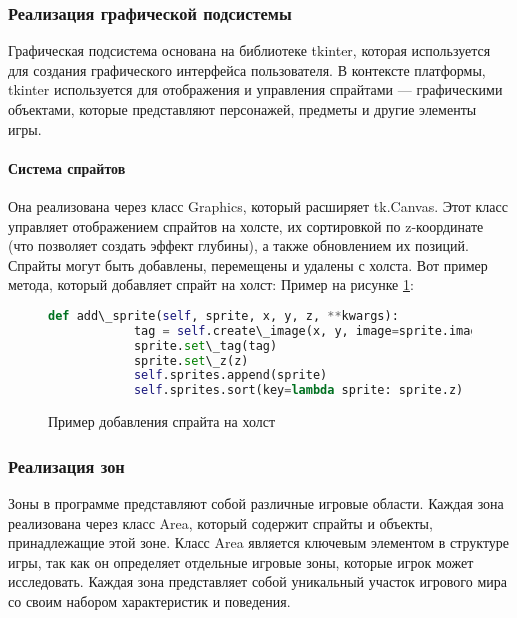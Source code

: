 \subsubsection{Реализация графической подсистемы}
Графическая подсистема основана на библиотеке tkinter, которая используется для создания графического интерфейса пользователя. В контексте платформы, tkinter используется для отображения и управления спрайтами — графическими объектами, которые представляют персонажей, предметы и другие элементы игры.
\paragraph{Система спрайтов}
Она реализована через класс Graphics, который расширяет tk.Canvas. Этот класс управляет отображением спрайтов на холсте, их сортировкой по z-координате (что позволяет создать эффект глубины), а также обновлением их позиций. Спрайты могут быть добавлены, перемещены и удалены с холста. Вот пример метода, который добавляет спрайт на холст:
Пример на рисунке \ref{ttk:image}:
\begin{figure}[H]
	\begin{lstlisting}[language=Python]
		def add\_sprite(self, sprite, x, y, z, **kwargs):
			tag = self.create\_image(x, y, image=sprite.image, anchor='center', **kwargs)
			sprite.set\_tag(tag)
			sprite.set\_z(z)
			self.sprites.append(sprite)
			self.sprites.sort(key=lambda sprite: sprite.z)
\end{lstlisting}  
\caption{Пример добавления спрайта на холст}
\label{ttk:image}
\end{figure}
\subsubsection{Реализация зон}
Зоны в программе представляют собой различные игровые области. Каждая зона реализована через класс Area, который содержит спрайты и объекты, принадлежащие этой зоне. Класс Area является ключевым элементом в структуре игры, так как он определяет отдельные игровые зоны, которые игрок может исследовать. Каждая зона представляет собой уникальный участок игрового мира со своим набором характеристик и поведения.

